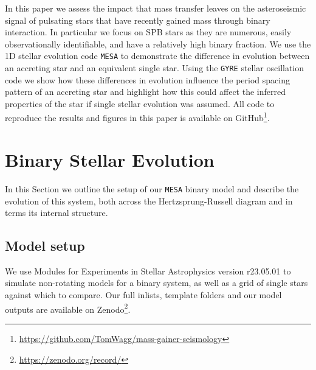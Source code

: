 \documentclass[twocolumn, twocolappendix, oneside]{aastex631}
\newcommand{\hrd}{Hertzsprung-Russell diagram\xspace}
\newcommand{\mesa}{\texttt{MESA}\xspace}
\newcommand{\gyre}{\texttt{GYRE}\xspace}
\begin{document}
In this paper we assess the impact that mass transfer leaves on the asteroseismic signal of pulsating stars that have recently gained mass through binary interaction. In particular we focus on SPB stars as they are numerous, easily observationally identifiable, and have a relatively high binary fraction. We use the 1D stellar evolution code \mesa to demonstrate the difference in evolution between an accreting star and an equivalent single star. Using the \gyre stellar oscillation code we show how these differences in evolution influence the period spacing pattern of an accreting star and highlight how this could affect the inferred properties of the star if single stellar evolution was assumed. All code to reproduce the results and figures in this paper is available on GitHub\footnote{\url{https://github.com/TomWagg/mass-gainer-seismology}}.

\section{Binary Stellar Evolution} \label{sec:methods}

In this Section we outline the setup of our \mesa binary model and describe the evolution of this system, both across the \hrd and in terms its internal structure.

\subsection{Model setup}\label{sec:model_setup}

We use Modules for Experiments in Stellar Astrophysics \citep[\mesa,][]{Paxton2011, Paxton2013, Paxton2015, Paxton2018, Paxton2019, Jermyn2023} version r23.05.01 \citep{mesa_zenodo} to simulate non-rotating models for a binary system, as well as a grid of single stars against which to compare. Our full inlists, template folders and our model outputs are available on Zenodo\footnote{\url{https://zenodo.org/record/}}.
\end{document}
